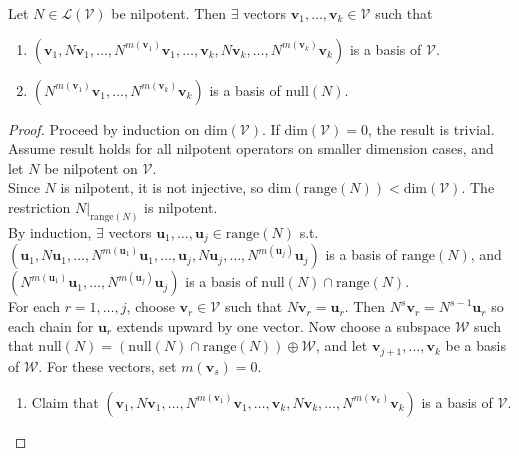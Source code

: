 \begin{lemma} \label{lem:nilpotentbasisequivalence} Let $N \in \mathcal{L}(\mathcal{V})$ be nilpotent. Then $\exists$ vectors $\mathbf{v}_1, \ldots, \mathbf{v}_k \in \mathcal{V}$ such that
\begin{enumerate}[label=\roman*.]
\setlength{\itemsep}{0pt}
\item $(\mathbf{v}_1, N\mathbf{v}_1, \ldots, N^{m(\mathbf{v}_1)}\mathbf{v}_1, \ldots, \mathbf{v}_k, N\mathbf{v}_k, \ldots, N^{m(\mathbf{v}_k)}\mathbf{v}_k)$ is a basis of $\mathcal{V}$.
\item $(N^{m(\mathbf{v}_1)}\mathbf{v}_1, \ldots, N^{m(\mathbf{v}_k)}\mathbf{v}_k)$ is a basis of $\text{null}(N)$.
\end{enumerate}
\begin{proof} Proceed by induction on $\text{dim}(\mathcal{V})$. If $\text{dim}(\mathcal{V}) = 0$, the result is trivial.\\
Assume result holds for all nilpotent operators on smaller dimension cases, and let $N$ be nilpotent on $\mathcal{V}$.\\
Since $N$ is nilpotent, it is not injective, so $\text{dim}(\text{range}(N)) < \text{dim}(\mathcal{V})$. The restriction $N|_{\text{range}(N)}$ is nilpotent.\\
By induction, $\exists$ vectors $\mathbf{u}_1, \ldots, \mathbf{u}_j \in \text{range}(N)$ s.t. $(\mathbf{u}_1, N \mathbf{u}_1, \ldots, N^{m(\mathbf{u}_1)}\mathbf{u}_1, \ldots, \mathbf{u}_j, N\mathbf{u}_j, \ldots, N^{m(\mathbf{u}_j)}\mathbf{u}_j)$ is a basis of $\text{range}(N)$, and $(N^{m(\mathbf{u}_1)}\mathbf{u}_1, \ldots, N^{m(\mathbf{u}_j)}\mathbf{u}_j)$ is a basis of $\text{null}(N) \cap \text{range}(N)$.\\
For each $r = 1, \ldots, j$, choose $\mathbf{v}_r \in \mathcal{V}$ such that $N\mathbf{v}_r = \mathbf{u}_r$. Then $N^s\mathbf{v}_r = N^{s-1} \mathbf{u}_r$ so each chain for $\mathbf{u}_r$ extends upward by one vector. Now choose a subspace $\mathcal{W}$ such that $\text{null}(N) = (\text{null}(N) \cap \text{range}(N)) \oplus \mathcal{W}$, and let $\mathbf{v}_{j+1}, \ldots, \mathbf{v}_k$ be a basis of $\mathcal{W}$. For these vectors, set $m(\mathbf{v}_s) = 0$.
\begin{enumerate}[label=\roman*.]
\setlength{\itemsep}{0pt}
\item[$(i)$] Claim that $(\mathbf{v}_1, N \mathbf{v}_1, \ldots, N^{m(\mathbf{v}_1)}\mathbf{v}_1, \ldots, \mathbf{v}_k, N\mathbf{v}_k, \ldots, N^{m(\mathbf{v}_k)}\mathbf{v}_k)$ is a basis of $\mathcal{V}$.\\

\end{enumerate}
\end{proof}
\end{lemma}
